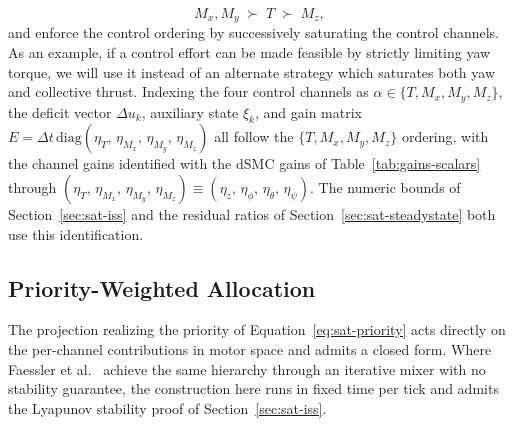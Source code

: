 \documentclass[conf]{new-aiaa}
\begin{document}
\begin{equation}
\label{eq:sat-priority}
M_x, M_y \;\succ\; T \;\succ\; M_z,
\end{equation}
and enforce the control ordering by successively saturating the control channels. As an example, if a control effort can be made feasible by strictly limiting yaw torque, we will use it instead of an alternate strategy which saturates both yaw and collective thrust. Indexing the four control channels as $\alpha \in \{T, M_x, M_y, M_z\}$, the deficit vector $\Delta u_k$, auxiliary state $\xi_k$, and gain matrix $E = \Delta t\,\mathrm{diag}(\eta_T,\, \eta_{M_x},\, \eta_{M_y},\, \eta_{M_z})$ all follow the $\{T, M_x, M_y, M_z\}$ ordering, with the channel gains identified with the dSMC gains of Table~\ref{tab:gains-scalars} through $(\eta_T,\, \eta_{M_x},\, \eta_{M_y},\, \eta_{M_z}) \equiv (\eta_z,\, \eta_\phi,\, \eta_\theta,\, \eta_\psi)$. The numeric bounds of Section~\ref{sec:sat-iss} and the residual ratios of Section~\ref{sec:sat-steadystate} both use this identification.

\subsection{Priority-Weighted Allocation}

The projection realizing the priority of Equation~\ref{eq:sat-priority} acts directly on the per-channel contributions in motor space and admits a closed form. Where Faessler et al.\ \cite{refs:Faessler2017} achieve the same hierarchy through an iterative mixer with no stability guarantee, the construction here runs in fixed time per tick and admits the Lyapunov stability proof of Section~\ref{sec:sat-iss}.
\end{document}
